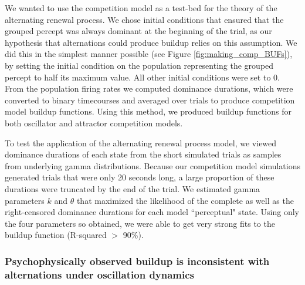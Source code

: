 \documentclass{frontiersSCNS} %
\begin{document}
We wanted to use the competition model as a test-bed for the theory of the alternating renewal process. We chose initial conditions that ensured that the grouped percept was always dominant at the beginning of the trial, as our hypothesis that alternations could produce buildup relies on this assumption. We did this in the simplest manner possible (see Figure \ref{fig:making_comp_BUFs}), by setting the initial condition on the population representing the grouped percept to half its maximum value. All other initial conditions were set to 0. From the population firing rates we computed dominance durations, which were converted to binary timecourses and averaged over trials to produce competition model buildup functions. Using this method, we produced buildup functions for both oscillator and attractor competition models.

To test the application of the alternating renewal process model, we viewed dominance durations of each state from the short simulated trials as samples from underlying gamma distributions. Because our competition model simulations generated trials that were only 20 seconds long, a large proportion of these durations were truncated by the end of the trial. We estimated gamma parameters $k$ and $\theta$ that maximized the likelihood of the complete as well as the right-censored dominance durations for each model ``perceptual" state. Using only the four parameters so obtained, we were able to get very strong fits to the buildup function (R-squared $>$ 90\%).

\subsubsection{Psychophysically observed buildup is inconsistent with alternations under oscillation dynamics}
\end{document}
